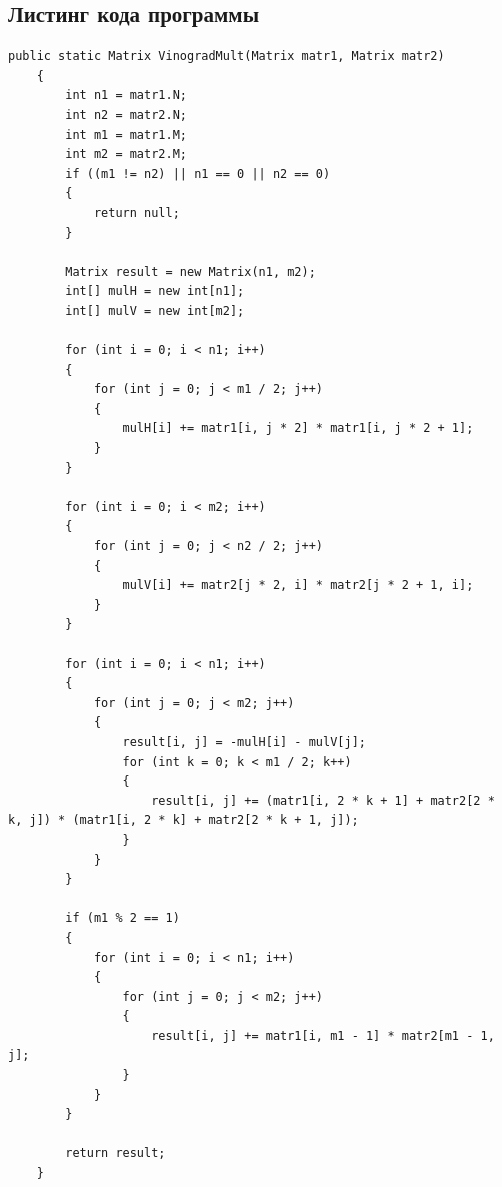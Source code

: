 \documentclass[14pt, a4paper]{extarticle}
\begin{document}
\subsection{Листинг кода программы}
\begin{lstlisting}[label=MultMatrVin, caption=Стандартный алгоритм Винограда]
	public static Matrix VinogradMult(Matrix matr1, Matrix matr2)
	{
		int n1 = matr1.N;
		int n2 = matr2.N;
		int m1 = matr1.M;
		int m2 = matr2.M;
		if ((m1 != n2) || n1 == 0 || n2 == 0)
		{
			return null;
		}
		
		Matrix result = new Matrix(n1, m2);
		int[] mulH = new int[n1];
		int[] mulV = new int[m2];
		
		for (int i = 0; i < n1; i++)
		{
			for (int j = 0; j < m1 / 2; j++)
			{
				mulH[i] += matr1[i, j * 2] * matr1[i, j * 2 + 1];
			}
		}
		
		for (int i = 0; i < m2; i++)
		{
			for (int j = 0; j < n2 / 2; j++)
			{
				mulV[i] += matr2[j * 2, i] * matr2[j * 2 + 1, i];
			}
		}
		
		for (int i = 0; i < n1; i++)
		{
			for (int j = 0; j < m2; j++)
			{
				result[i, j] = -mulH[i] - mulV[j];
				for (int k = 0; k < m1 / 2; k++)
				{
					result[i, j] += (matr1[i, 2 * k + 1] + matr2[2 * k, j]) * (matr1[i, 2 * k] + matr2[2 * k + 1, j]);
				}
			}
		}
		
		if (m1 % 2 == 1)
		{
			for (int i = 0; i < n1; i++)
			{
				for (int j = 0; j < m2; j++)
				{
					result[i, j] += matr1[i, m1 - 1] * matr2[m1 - 1, j];
				}
			}
		}
		
		return result;
	}
\end{lstlisting}
\end{document}
